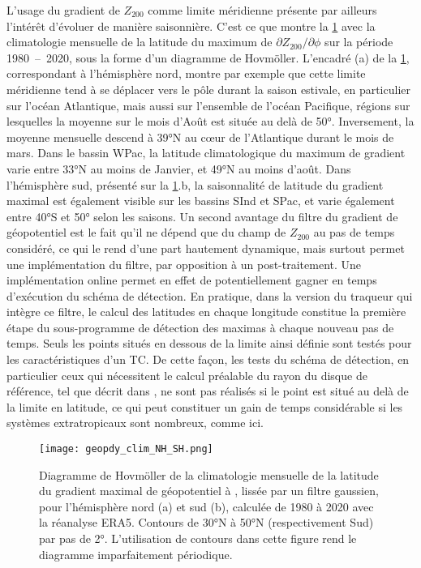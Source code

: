 \documentclass[../main.tex]{subfiles}
\begin{document}
L'usage du gradient de $Z_{200}$ comme limite méridienne présente par ailleurs l'intérêt d'évoluer de manière saisonnière. C'est ce que montre la
\cref{fig:geopdy_clim} avec la climatologie mensuelle de la latitude du maximum de $\partial Z_{200} / \partial \phi$ sur la période \num{1980}~--~\num{2020},
sous la forme d'un diagramme de Hovmöller. L'encadré (a) de la \cref{fig:geopdy_clim}, correspondant à l'hémisphère nord, montre par exemple que cette limite
méridienne tend à se déplacer vers le pôle durant la saison estivale, en particulier sur l'océan Atlantique, mais aussi sur l'ensemble de l'océan Pacifique,
régions sur lesquelles la moyenne sur le mois d'Août est située au delà de \ang{50}. Inversement, la moyenne mensuelle descend à \ang{39}N au cœur de
l'Atlantique durant le mois de mars. Dans le bassin WPac, la latitude climatologique du maximum de gradient varie entre \ang{33}N au moins de Janvier, et
\ang{49}N au moins d'août. Dans l'hémisphère sud, présenté sur la \cref{fig:geopdy_clim}.b, la saisonnalité de latitude du gradient maximal est également
visible sur les bassins SInd et SPac, et varie également entre \ang{40}S et \ang{50} selon les saisons. Un second avantage du filtre du gradient de géopotentiel
est le fait qu'il ne dépend que du champ de $Z_{200}$ au pas de temps considéré, ce qui le rend d'une part hautement dynamique, mais surtout permet une
implémentation  du filtre, par opposition à un post-traitement. Une implémentation online permet en effet de potentiellement gagner en temps
d'exécution du schéma de détection. En pratique, dans la version du traqueur qui intègre ce filtre, le calcul des latitudes en chaque longitude constitue la
première étape du sous-programme de détection des maximas à chaque nouveau pas de temps. Seuls les points situés en dessous de la limite ainsi définie sont
testés pour les caractéristiques d'un TC. De cette façon, les tests du schéma de détection, en particulier ceux qui nécessitent le calcul préalable du rayon du
disque de référence, tel que décrit dans \textcite{chauvin_response_2006,dulac_assessing_2023}, ne sont pas réalisés si le point est situé au delà de la limite
en latitude, ce qui peut constituer un gain de temps considérable si les systèmes extratropicaux sont nombreux, comme ici. 

\begin{figure}[htbp]
    \centering
    \texttt{[image: geopdy\_clim\_NH\_SH.png]}
    \caption{Diagramme de Hovmöller de la climatologie mensuelle de la latitude du gradient maximal de géopotentiel à , lissée par un filtre gaussien,
    pour l'hémisphère nord (a) et sud (b), calculée de \num{1980} à \num{2020} avec la réanalyse ERA5. Contours de \ang{30}N à \ang{50}N (respectivement Sud)
    par pas de \ang{2}. L'utilisation de contours dans cette figure rend le diagramme imparfaitement périodique.}
    \label{fig:geopdy_clim}
\end{figure}
\end{document}
